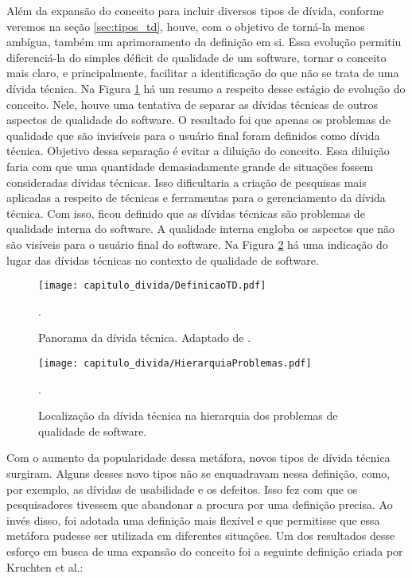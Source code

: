 Além da expansão do conceito para incluir diversos tipos de dívida, conforme veremos na seção \ref{sec:tipos_td}, houve, com o objetivo de torná-la menos ambígua, também um aprimoramento da definição em si. Essa evolução permitiu diferenciá-la do simples déficit de qualidade de um software, tornar o conceito mais claro, e principalmente, facilitar a identificação do que não se trata de uma dívida técnica. Na Figura \ref{fig:cap1_panorama_td} há um resumo a respeito desse estágio de evolução do conceito. Nele, houve uma tentativa de separar as dívidas técnicas de outros aspectos de qualidade do software. O resultado foi que apenas os problemas de qualidade que são invisíveis para o usuário final foram definidos como dívida técnica. Objetivo dessa separação é evitar a diluição do conceito. Essa diluição faria com que uma quantidade demasiadamente grande de situações fossem consideradas dívidas técnicas. Isso dificultaria a criação de pesquisas mais aplicadas a respeito de técnicas e ferramentas para o gerenciamento da dívida técnica. Com isso, ficou definido que as dívidas técnicas são problemas de qualidade interna do software. A qualidade interna engloba os aspectos que não são visíveis para o usuário final do software\cite{al2010quality}. Na Figura \ref{fig:cap1_hierarquia_qualidade} há uma indicação do lugar das dívidas técnicas no contexto de qualidade de software.


 \begin{figure}[H]
  \centering
  \texttt{[image: capitulo\_divida/DefinicaoTD.pdf]} 
  \caption{Panorama da dívida técnica. Adaptado de \cite{kruchten2013technical}. }.
  \label{fig:cap1_panorama_td} 
\end{figure}

 \begin{figure}[H]
  \centering
  \texttt{[image: capitulo\_divida/HierarquiaProblemas.pdf]} 
  \caption{Localização da dívida técnica na hierarquia dos problemas de qualidade de software. }.
  \label{fig:cap1_hierarquia_qualidade} 
\end{figure}


Com o aumento da popularidade dessa metáfora, novos tipos de dívida técnica surgiram. Alguns desses novo tipos não se enquadravam nessa definição, como, por exemplo, as dívidas de usabilidade e os defeitos. Isso fez com que os pesquisadores tivessem que abandonar a procura por uma definição precisa. Ao invés disso, foi adotada uma definição mais flexível e que permitisse que essa metáfora pudesse ser utilizada em diferentes situações. Um dos resultados desse esforço em busca de uma expansão do conceito foi a seguinte definição criada por Kruchten et al.\cite{kruchten2013technical}:

